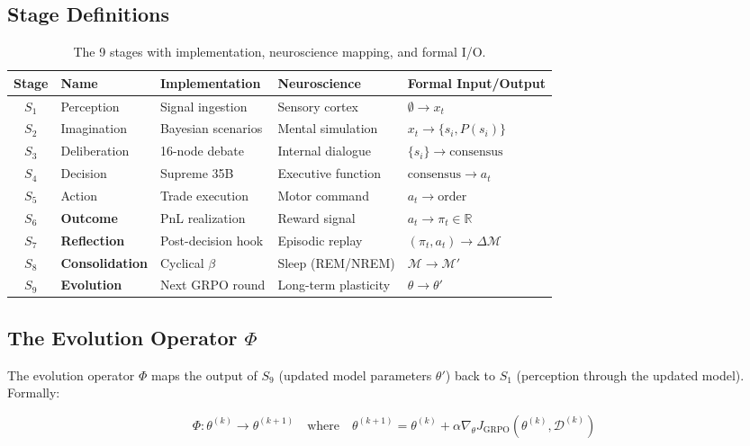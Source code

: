 \documentclass[11pt, a4paper]{article}
\begin{document}
\subsection{Stage Definitions}

\begin{table}[H]
\centering
\small
\begin{tabular}{clllp{4.5cm}}
\toprule
\textbf{Stage} & \textbf{Name} & \textbf{Implementation} & \textbf{Neuroscience} & \textbf{Formal Input/Output} \\
\midrule
$S_1$ & Perception & Signal ingestion & Sensory cortex & $\emptyset \to x_t$ \\
$S_2$ & Imagination & Bayesian scenarios & Mental simulation & $x_t \to \{s_i, P(s_i)\}$ \\
$S_3$ & Deliberation & 16-node debate & Internal dialogue & $\{s_i\} \to \text{consensus}$ \\
$S_4$ & Decision & Supreme 35B & Executive function & $\text{consensus} \to a_t$ \\
$S_5$ & Action & Trade execution & Motor command & $a_t \to \text{order}$ \\
\midrule
$S_6$ & \textbf{Outcome} & PnL realization & Reward signal & $a_t \to \pi_t \in \mathbb{R}$ \\
$S_7$ & \textbf{Reflection} & Post-decision hook & Episodic replay & $(\pi_t, a_t) \to \Delta\mathcal{M}$ \\
$S_8$ & \textbf{Consolidation} & Cyclical $\beta$ & Sleep (REM/NREM) & $\mathcal{M} \to \mathcal{M}'$ \\
$S_9$ & \textbf{Evolution} & Next GRPO round & Long-term plasticity & $\theta \to \theta'$ \\
\bottomrule
\end{tabular}
\caption{The 9 stages with implementation, neuroscience mapping, and formal I/O.}
\label{tab:stages}
\end{table}

\subsection{The Evolution Operator $\Phi$}

The evolution operator $\Phi$ maps the output of $S_9$ (updated model parameters $\theta'$) back to $S_1$ (perception through the updated model). Formally:

\begin{equation}
  \Phi: \theta^{(k)} \to \theta^{(k+1)} \quad \text{where} \quad \theta^{(k+1)} = \theta^{(k)} + \alpha \nabla_\theta J_{\text{GRPO}}(\theta^{(k)}, \mathcal{D}^{(k)})
\end{equation}
\end{document}

